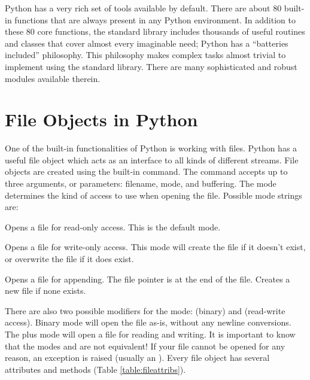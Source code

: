 
Python has a very rich set of tools available by default.
There are about 80 built-in functions that are always present in any Python environment.
In addition to these 80 core functions, the standard library includes thousands of useful routines and classes that cover almost every imaginable need;
Python has a ``batteries included'' philosophy.
This philosophy makes complex tasks almost trivial to implement using the standard library.
There are many sophisticated and robust modules available therein.

\section*{File Objects in Python}
One of the built-in functionalities of Python is working with files.
Python has a useful file object which acts as an interface to all kinds of different streams.
File objects are created using the built-in  command.
The  command accepts up to three arguments, or parameters: filename, mode, and buffering.
The mode determines the kind of access to use when opening the file.
Possible mode strings are:
\begin{description}
\item {} Opens a file for read-only access.
This is the default mode.
\item {} Opens a file for write-only access.
This mode will create the file if it doesn't exist, or overwrite the file if it does exist.
\item {} Opens a file for appending.
The file pointer is at the end of the file.
Creates a new file if none exists.
\end{description}
There are also two possible modifiers for the mode:  (binary) and \li{+} (read-write access).
Binary mode will open the file as-is, without any newline conversions.
The plus mode will open a file for reading and writing.
It is important to know that the modes  and  are not equivalent!
If your file cannot be opened for any reason, an exception is raised (usually an ).
Every file object has several attributes and methods (Table \ref{table:fileattribs}).
